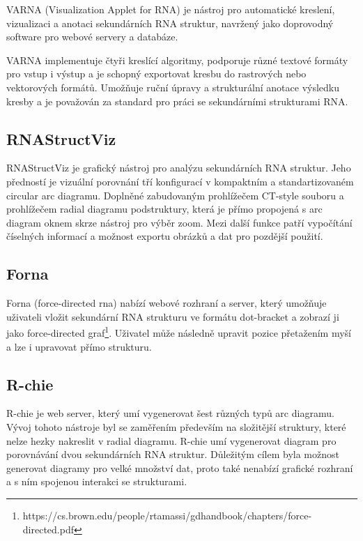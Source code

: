 VARNA (Visualization Applet for RNA) je nástroj pro automatické
kreslení, vizualizaci a anotaci sekundárních RNA struktur, navržený jako
doprovodný software pro webové servery a databáze.

VARNA implementuje čtyři kreslící algoritmy, podporuje různé textové formáty
pro vstup i výstup a je schopný exportovat kresbu do rastrových nebo
vektorových formátů. Umožňuje ruční úpravy a strukturální anotace výsledku
kresby a je považován za standard pro práci se sekundárními strukturami RNA.

\subsection{RNAStructViz} 

RNAStructViz\cite{RnaStructViz} je grafický nástroj pro analýzu sekundárních
RNA struktur. Jeho předností je vizuální porovnání tří konfigurací v kompaktním
a standartizovaném circular arc diagramu. Doplněné zabudovaným prohlížečem
CT-style souboru a prohlížečem radial diagramu podstruktury, která je přímo
propojená s arc diagram oknem skrze nástroj pro výběr zoom. Mezi další funkce
patří vypočítání číselných informací a možnost exportu obrázků a dat pro
pozdější použití.

\subsection{Forna} 

Forna\cite{Forna} (force-directed rna) nabízí webové rozhraní a server, který
umožňuje uživateli vložit sekundární RNA strukturu ve formátu dot-bracket a
zobrazí ji jako force-directed
graf\footnote{https://cs.brown.edu/people/rtamassi/gdhandbook/chapters/force-directed.pdf}.
Uživatel může následně upravit pozice přetažením myší a lze i upravovat přímo
strukturu. 

\subsection{R-chie} 

R-chie \cite{Rchie} je web server, který umí vygenerovat šest různých typů arc
diagramu. Vývoj tohoto nástroje byl se zaměřením především na složitější
struktury, které nelze hezky nakreslit v radial diagramu. R-chie umí
vygenerovat diagram pro porovnávání dvou sekundárních RNA struktur. Důležitým
cílem byla možnost generovat diagramy pro velké množství dat, proto také
nenabízí grafické rozhraní a s ním spojenou interakci se strukturami. 

